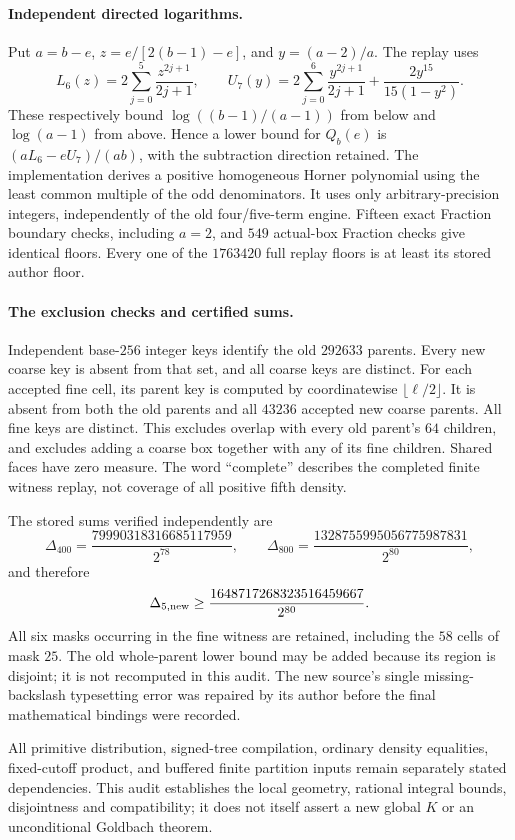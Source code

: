 \paragraph{Independent directed logarithms.}
Put $a=b-e$, $z=e/[2(b-1)-e]$, and $y=(a-2)/a$. The replay uses
\[
 L_6(z)=2\sum_{j=0}^{5}\frac{z^{2j+1}}{2j+1},\qquad
 U_7(y)=2\sum_{j=0}^{6}\frac{y^{2j+1}}{2j+1}
       +\frac{2y^{15}}{15(1-y^2)}.
\]
These respectively bound $\log((b-1)/(a-1))$ from below and
$\log(a-1)$ from above. Hence a lower bound for $Q_b(e)$ is
$(aL_6-eU_7)/(ab)$, with the subtraction direction retained.
The implementation derives a positive homogeneous Horner polynomial
using the least common multiple of the odd denominators. It uses only
arbitrary-precision integers, independently of the old four/five-term
engine. Fifteen exact Fraction boundary checks, including $a=2$, and
$549$ actual-box Fraction checks give identical floors. Every one of
the $1763420$ full replay floors is at least its stored author floor.

\paragraph{The exclusion checks and certified sums.}
Independent base-$256$ integer keys identify the old $292633$ parents.
Every new coarse key is absent from that set, and all coarse keys are
distinct. For each accepted fine cell, its parent key is computed by
coordinatewise $\lfloor\ell/2\rfloor$. It is absent from both the old
parents and all $43236$ accepted new coarse parents. All fine keys are
distinct. This excludes overlap with every old parent's $64$ children,
and excludes adding a coarse box together with any of its fine children.
Shared faces have zero measure. The word ``complete'' describes the
completed finite witness replay, not coverage of all positive fifth density.

The stored sums verified independently are
\[
 \Delta_{400}=\frac{79990318316685117959}{2^{78}},\qquad
 \Delta_{800}=\frac{1328755995056775987831}{2^{80}},
\]
and therefore
\[
 \Delta_{5,\rm new}\ge
 \frac{1648717268323516459667}{2^{80}}.
\]
All six masks occurring in the fine witness are retained, including
the $58$ cells of mask $25$. The old whole-parent lower bound may be
added because its region is disjoint; it is not recomputed in this audit.
The new source's single missing-backslash typesetting error was repaired
by its author before the final mathematical bindings were recorded.

All primitive distribution, signed-tree compilation, ordinary density
equalities, fixed-cutoff product, and buffered finite partition inputs
remain separately stated dependencies. This audit establishes the local
geometry, rational integral bounds, disjointness and compatibility; it
does not itself assert a new global $K$ or an unconditional Goldbach theorem.
